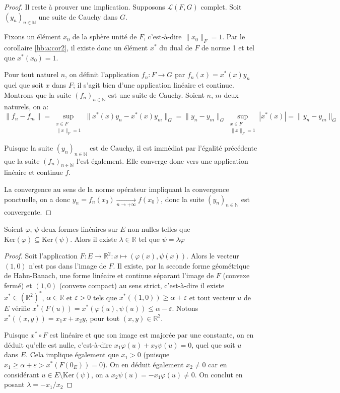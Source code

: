 \begin{proof}
  Il reste à prouver une implication. Supposons $\mathscr{L}(F, G)$ complet.
  Soit $(y_n)_{n\in\mathbb{N}}$ une suite de Cauchy dans $G$.

  Fixons un élément $x_0$ de la sphère unité de $F$, c'est-à-dire
  $\|x_0\|_F = 1$. Par le corollaire \ref{hb:a:cor2}, il existe
  donc un élément $x^*$ du dual de $F$ de norme 1 et tel que $x^*(x_0) = 1$.

  Pour tout naturel $n$, on définit l'application $f_n: F\to G$
  par $f_n(x) = x^*(x)y_n$ quel que soit $x$ dans $F$;
  il s'agit bien d'une application linéaire
  et continue. Montrons que la suite $(f_n)_{n\in\mathbb{N}}$ est une suite
  de Cauchy. Soient $n$, $m$ deux naturels, on a:
  $$\|f_n-f_m\| =
  \sup_{\substack{x\in F\\\|x\|_F = 1}}\|x^*(x)y_n - x^*(x)y_m\|_G =
  \|y_n - y_m\|_G \sup_{\substack{x\in F\\\|x\|_F = 1}} |x^*(x)| =
  \|y_n - y_m\|_G $$

  Puisque la suite $(y_n)_{n\in\mathbb{N}}$ est de Cauchy, il est immédiat
  par l'égalité précédente que la suite $(f_n)_{n\in\mathbb{N}}$ l'est
  également. Elle converge donc vers une application linéaire et continue
  $f$.

  La convergence au sens de la norme opérateur impliquant la
  convergence ponctuelle, on a donc
  $y_n = f_n(x_0)\xrightarrow[n\to+\infty]{} f(x_0)$, donc
  la suite $(y_n)_{n\in\mathbb{N}}$ est convergente.

\end{proof}

\begin{prop}\label{ker:sub:mult}
  Soient $\varphi$, $\psi$ deux formes linéaires sur $E$ non nulles telles
  que $\mathrm{Ker}(\varphi) \subseteq \mathrm{Ker}(\psi)$. Alors
  il existe $\lambda \in\mathbb{R}$ tel que $\psi = \lambda \varphi$
\end{prop}

\begin{proof}
  Soit l'application $F: E \to \mathbb{R}^2: x\mapsto (\varphi(x), \psi(x))$.
  Alors le vecteur $(1, 0)$ n'est pas dans l'image de $F$. Il existe,
  par la seconde forme géométrique de Hahn-Banach, une forme linéaire
  et continue séparant l'image de $F$ (convexe fermé) et $(1, 0)$ (convexe
  compact) au sens strict, c'est-à-dire il existe $x^*\in (\mathbb{R}^2)^*$,
  $\alpha\in\mathbb{R}$ et $\varepsilon > 0$ tels que $x^*((1, 0))\geq
  \alpha +\varepsilon$ et tout vecteur $u$ de $E$ vérifie
  $x^*(F(u)) = x^*(\varphi(u), \psi(u))\leq \alpha-\varepsilon$.
  Notons
  $x^*((x, y)) = x_1 x + x_2 y$, pour tout $(x, y)\in\mathbb{R}^2$.

  Puisque $x^*\circ F$ est linéaire et que son image est majorée par une
  constante, on en déduit qu'elle est nulle, c'est-à-dire $x_1 \varphi(u) +
  x_2 \psi(u) = 0$, quel que soit $u$ dans $E$.
  Cela implique également que $x_1 > 0$ (puisque $x_1 \geq
  \alpha + \varepsilon > x^*(F(0_E)) = 0$).
  On en déduit également $x_2\neq 0$ car en considérant $u\in E\setminus
  \mathrm{Ker}(\psi)$, on a $x_2 \psi(u) = -x_1\varphi(u) \neq 0 $.
On conclut en posant $\lambda = -x_1/x_2$
\end{proof}

